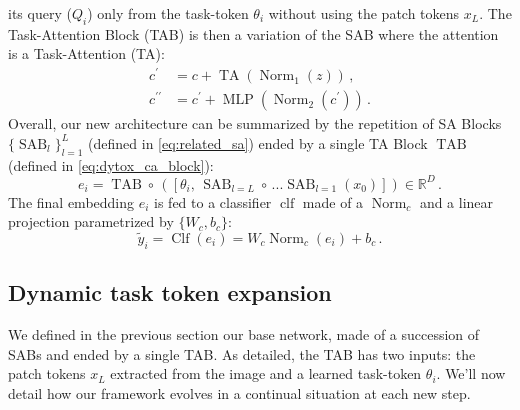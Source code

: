 its query ($Q_i$) only from the task-token $\theta_i$ without using the patch tokens $x_L$. The
Task-Attention Block (TAB) is then a variation of the SAB where the attention is a Task-Attention
(TA):
\begin{equation}
    \begin{aligned}
        c^{\prime}       & =c+\operatorname{TA}\left(\operatorname{Norm}_1\left(z\right)\right)\,,                    \\
        c^{\prime\prime} & =c^{\prime}+\operatorname{MLP}\left(\operatorname{Norm}_2\left(c^{\prime}\right)\right)\,.
    \end{aligned}
    \label{eq:dytox_ca_block}
\end{equation}
Overall, our new architecture can be summarized by the repetition of SA Blocks
$\{\operatorname{SAB}_l\}_{l=1}^{L}$ (defined in \autoref{eq:related_sa}) ended by a single TA Block
$\operatorname{TAB}$ (defined in \autoref{eq:dytox_ca_block}):
%
\begin{equation}
    e_i = \operatorname{TAB} \circ\, ([\theta_i,\, \operatorname{SAB}_{l=L} \circ\, ... \operatorname{SAB}_{l=1}(x_0)]) \in \mathbb{R}^D\,.
    \label{eq:dytox_cab_sab}
\end{equation}
%
The final embedding $e_i$ is fed to a classifier $\operatorname{clf}$ made of a
$\operatorname{Norm}_c$ and a linear projection parametrized by $\{W_c, b_c\}$:
%
\begin{equation}
    \tilde{y}_i = \operatorname{Clf}(e_i) = W_c \operatorname{Norm}_c(e_i) + b_c\,.
\end{equation}

\subsection{Dynamic task token expansion}
\label{sec:dytox_ensembling_tab}
We defined in the previous section our base network, made of a succession of SABs and ended by a
single TAB. As detailed, the TAB has two inputs: the patch tokens $x_L$ extracted from the image and
a learned task-token $\theta_i$. We'll now detail how our framework evolves in a continual situation
at each new step.

